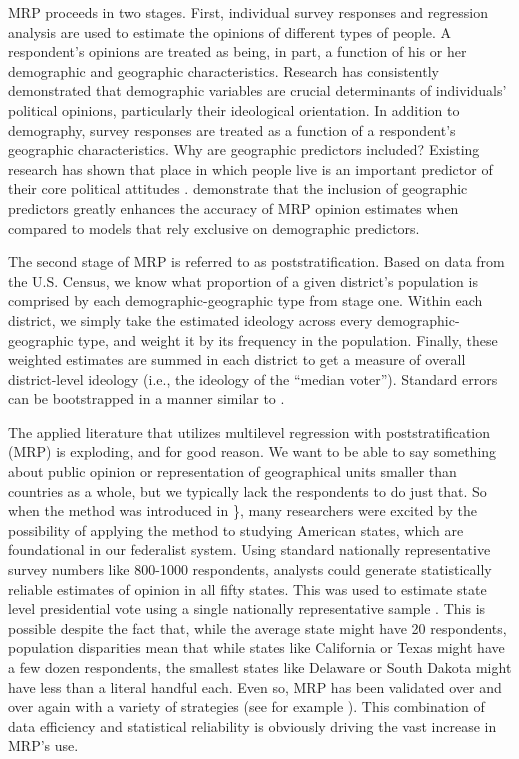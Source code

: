 \documentclass[
  oneside]{book}
\begin{document}
MRP proceeds in two stages. First, individual survey responses and regression analysis are used to estimate the opinions of different types of people. A respondent's opinions are treated as being, in part, a function of his or her demographic and geographic characteristics. Research has consistently demonstrated that demographic variables are crucial determinants of individuals' political opinions, particularly their ideological orientation. In addition to demography, survey responses are treated as a function of a respondent's geographic characteristics. Why are geographic predictors included? Existing research has shown that place in which people live is an important predictor of their core political attitudes \citep{Erikson:1993}. \citet{Lax:2009b} demonstrate that the inclusion of geographic predictors greatly enhances the accuracy of MRP opinion estimates when compared to models that rely exclusive on demographic predictors.

The second stage of MRP is referred to as poststratiﬁcation. Based on data from the U.S. Census, we know what proportion of a given district's population is comprised by each demographic-geographic type from stage one. Within each district, we simply take the estimated ideology across every demographic-geographic type, and weight it by its frequency in the population. Finally, these weighted estimates are summed in each district to get a measure of overall district-level ideology (i.e., the ideology of the ``median voter''). Standard errors can be bootstrapped in a manner similar to \citet{Kastellec:2015}.

The applied literature that utilizes multilevel regression with poststratification (MRP) is exploding, and for good reason. We want to be able to say something about public opinion or representation of geographical units smaller than countries as a whole, but we typically lack the respondents to do just that. So when the method was introduced in \citet{Gelman:1997}\}, many researchers were excited by the possibility of applying the method to studying American states, which are foundational in our federalist system. Using standard nationally representative survey numbers like 800-1000 respondents, analysts could generate statistically reliable estimates of opinion in all fifty states. This was used to estimate state level presidential vote using a single nationally representative sample \citep{Park:2004}. This is possible despite the fact that, while the average state might have 20 respondents, population disparities mean that while states like California or Texas might have a few dozen respondents, the smallest states like Delaware or South Dakota might have less than a literal handful each. Even so, MRP has been validated over and over again with a variety of strategies (see for example \citet{Lax:2009}). This combination of data efficiency and statistical reliability is obviously driving the vast increase in MRP's use.
\end{document}
